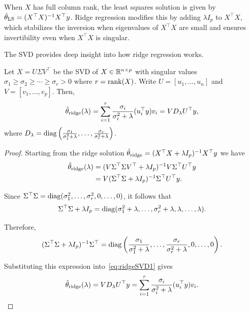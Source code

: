 When $X$ has full column rank, the least squares solution is given by
$\hat{\theta}_{\text{LS}} = (X^\top X)^{-1}X^\top y$.
Ridge regression modifies this by adding $\lambda I_p$ to $X^\top X$, which stabilizes the inversion when eigenvalues of $X^\top X$ are small and ensures invertibility even when $X^\top X$ is singular.

The SVD provides deep insight into how ridge regression works.

\begin{theorem}\label{thm:ridge_svd}
Let $X = U\Sigma V^\top$ be the SVD of $X \in \mathbb{R}^{n \times p}$ 
with singular values $\sigma_1 \geq \sigma_2 \geq \cdots \geq \sigma_r > 0$ where 
$r = \operatorname{rank}(X)$. Write $U = [u_1, \ldots, u_n]$ and 
$V = [v_1, \ldots, v_p]$.
Then,
\begin{equation}\label{eq:ridge_svd}
  \hat{\theta}_{\text{ridge}}(\lambda) = \sum_{i=1}^r \frac{\sigma_i}{\sigma_i^2 + \lambda}
  (u_i^\top y)v_i
  = VD_\lambda U^\top y,
\end{equation}
where $D_\lambda = \operatorname{diag}\left(\frac{\sigma_1}{\sigma_1^2 + \lambda}, \ldots, 
\frac{\sigma_r}{\sigma_r^2 + \lambda}\right)$.
\end{theorem}



\begin{proof}
Starting from the ridge solution $\hat{\theta}_{\text{ridge}} = (X^\top X + \lambda I_p)^{-1}X^\top y$ we have
\begin{align}
  \hat{\theta}_{\text{ridge}}(\lambda)
  &= (V\Sigma^\top\Sigma V^\top + \lambda I_p)^{-1}V\Sigma^\top U^\top y \notag\\
  &= V(\Sigma^\top\Sigma + \lambda I_p)^{-1}\Sigma^\top U^\top y.\label{eq:ridgeSVD1}
\end{align}

Since $\Sigma^\top\Sigma = \operatorname{diag}(\sigma_1^2, \ldots, \sigma_r^2, 0, \ldots, 0)$, it follows that
$$\Sigma^\top\Sigma + \lambda I_p = 
\operatorname{diag}(\sigma_1^2 + \lambda, \ldots, \sigma_r^2 + \lambda, \lambda, \ldots, \lambda).$$

Therefore,
$$(\Sigma^\top\Sigma + \lambda I_p)^{-1}\Sigma^\top
= \operatorname{diag}\left(\frac{\sigma_1}{\sigma_1^2 + \lambda}, \ldots, 
\frac{\sigma_r}{\sigma_r^2 + \lambda}, 0, \ldots, 0\right).$$

Substituting this expression into~\eqref{eq:ridgeSVD1} gives
\begin{equation}\label{eq:ridgeSVD2}
\hat{\theta}_{\text{ridge}}(\lambda) = VD_\lambda U^\top y
= \sum_{i=1}^r \frac{\sigma_i}{\sigma_i^2 + \lambda}(u_i^\top y)v_i.
\end{equation}


\end{proof}

